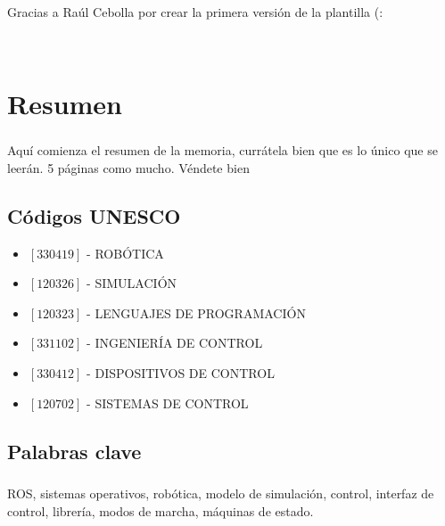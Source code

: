 \documentclass[11pt,a4paper,twoside,openright]{report}
\begin{document}
\paragraph*{}
Gracias a Raúl Cebolla por crear la primera versión de la plantilla (:


\newpage
$\ $
\thispagestyle{empty} %


\chapter*{Resumen} %

\paragraph*{}
Aquí comienza el resumen de la memoria, currátela bien que es lo único que se leerán. 5 páginas como mucho. Véndete bien


\newpage

\section*{Códigos UNESCO}

\begin{itemize}
\item $[330419]$ - ROBÓTICA
\item $[120326]$ - SIMULACIÓN
\item $[120323]$ - LENGUAJES DE PROGRAMACIÓN
\item $[331102]$ - INGENIERÍA DE CONTROL
\item $[330412]$ - DISPOSITIVOS DE CONTROL
\item $[120702]$ - SISTEMAS DE CONTROL
\end{itemize}

\section*{Palabras clave}

\paragraph*{}
ROS, sistemas operativos, robótica, modelo de simulación, control, interfaz de control, librería, modos de marcha, máquinas de estado.
\end{document}
